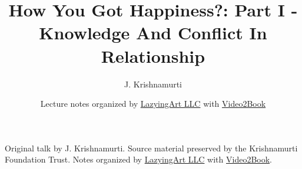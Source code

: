 \documentclass[11pt,oneside]{book}
\begin{document}
\frontmatter
\title{How You Got Happiness?: Part I - Knowledge And Conflict In Relationship}
\author{J. Krishnamurti}
\date{Lecture notes organized by \href{https://lazying.art}{LazyingArt LLC} with \href{https://github.com/lachlanchen/Video2Book}{Video2Book}}
\maketitle
\begin{center}
\small Original talk by J. Krishnamurti. Source material preserved by the Krishnamurti Foundation Trust. Notes organized by \href{https://lazying.art}{LazyingArt LLC} with \href{https://github.com/lachlanchen/Video2Book}{Video2Book}.
\end{center}
\clearpage
\mainmatter

\end{document}
